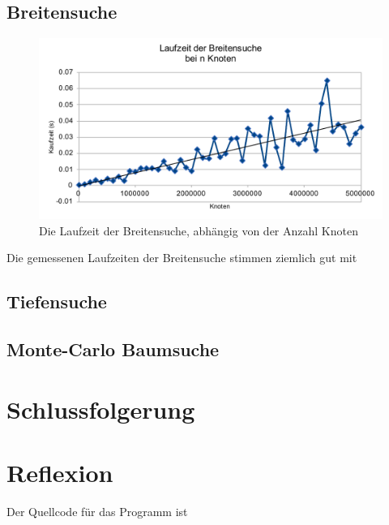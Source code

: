 \documentclass[a4paper,11pt]{article}
\begin{document}
\subsection{Breitensuche}
	\begin{figure}[h]
		\centering
		\includegraphics[width=0.85\linewidth]{img/BFS_size.pdf}
		\caption{Die Laufzeit der Breitensuche, abhängig von der Anzahl Knoten}
	\end{figure}
	
Die gemessenen Laufzeiten der Breitensuche stimmen ziemlich gut mit 
\subsection{Tiefensuche}
\subsection{Monte-Carlo Baumsuche}

\section{Schlussfolgerung}
\section{Reflexion}
Der Quellcode für das Programm ist 

\pagebreak


\end{document}
